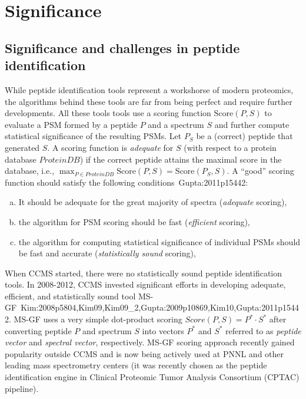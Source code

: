 \section{Significance}

\subsection{Significance and challenges in peptide identification}

While peptide identification tools represent a workshorse of modern proteomics, the algorithms behind these tools are far from being perfect and require further developments. 
All these tools tools use a scoring function $\textrm{Score}(P,S)$ to evaluate a PSM 
formed by a peptide $P$ and a spectrum $S$
and further compute statistical significance 
of the resulting PSMs.
Let $P_S$ be a (correct) peptide that generated  $S$.
A scoring function is {\em adequate} for  $S$ (with respect to a protein database $ProteinDB$) if the correct peptide attains the maximal score in the database, i.e., $\max_{P \in ProteinDB} \textrm{Score}(P,S) = \textrm{Score}(P_S,S)$.
A ``good'' scoring function should satisfy the following conditions~\cite{unv}{Gupta:2011p15442}:
\begin{enumerate}[(a)]
\item It should be adequate for the great majority of spectra ({\em adequate} scoring),
\item the algorithm for PSM scoring should be fast ({\em efficient} scoring),
\item the algorithm for computing statistical significance of individual PSMs should be fast and accurate ({\em statistically sound} scoring), 
\end{enumerate}

When CCMS started, there were no statistically sound peptide identification tools.  
In 2008-2012, CCMS invested significant efforts in developing adequate, efficient, and statistically sound tool MS-GF~\cite{unv}{Kim:2008p5804,Kim09,Kim09_2,Gupta:2009p10869,Kim10,Gupta:2011p15442}.  MS-GF  uses a very simple dot-product scoring $Score(P,S)=P^* \cdot S^*$
after converting peptide $P$ and spectrum $S$ into vectors $P^*$ and $S^*$ referred to as {\em peptide vector} and {\em spectral vector}, respectively.
MS-GF scoring approach recently gained popularity outside CCMS and is now being actively used at PNNL and other leading mass spectrometry centers 
(it was recently chosen as the peptide identification engine in Clinical Proteomic Tumor Analysis Consortium (CPTAC) pipeline). 

